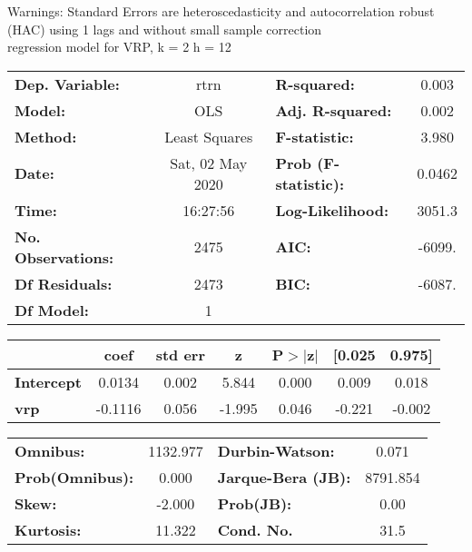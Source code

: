 Warnings: \newline
 [1] Standard Errors are heteroscedasticity and autocorrelation robust (HAC) using 1 lags and without small sample correction\\ 

regression model for VRP, k = 2 h = 12\begin{center}
\begin{tabular}{lclc}
\toprule
\textbf{Dep. Variable:}    &       rtrn       & \textbf{  R-squared:         } &     0.003   \\
\textbf{Model:}            &       OLS        & \textbf{  Adj. R-squared:    } &     0.002   \\
\textbf{Method:}           &  Least Squares   & \textbf{  F-statistic:       } &     3.980   \\
\textbf{Date:}             & Sat, 02 May 2020 & \textbf{  Prob (F-statistic):} &   0.0462    \\
\textbf{Time:}             &     16:27:56     & \textbf{  Log-Likelihood:    } &    3051.3   \\
\textbf{No. Observations:} &        2475      & \textbf{  AIC:               } &    -6099.   \\
\textbf{Df Residuals:}     &        2473      & \textbf{  BIC:               } &    -6087.   \\
\textbf{Df Model:}         &           1      & \textbf{                     } &             \\
\bottomrule
\end{tabular}
\begin{tabular}{lcccccc}
                   & \textbf{coef} & \textbf{std err} & \textbf{z} & \textbf{P$> |$z$|$} & \textbf{[0.025} & \textbf{0.975]}  \\
\midrule
\textbf{Intercept} &       0.0134  &        0.002     &     5.844  &         0.000        &        0.009    &        0.018     \\
\textbf{vrp}       &      -0.1116  &        0.056     &    -1.995  &         0.046        &       -0.221    &       -0.002     \\
\bottomrule
\end{tabular}
\begin{tabular}{lclc}
\textbf{Omnibus:}       & 1132.977 & \textbf{  Durbin-Watson:     } &    0.071  \\
\textbf{Prob(Omnibus):} &   0.000  & \textbf{  Jarque-Bera (JB):  } & 8791.854  \\
\textbf{Skew:}          &  -2.000  & \textbf{  Prob(JB):          } &     0.00  \\
\textbf{Kurtosis:}      &  11.322  & \textbf{  Cond. No.          } &     31.5  \\
\bottomrule
\end{tabular}
\end{center}


